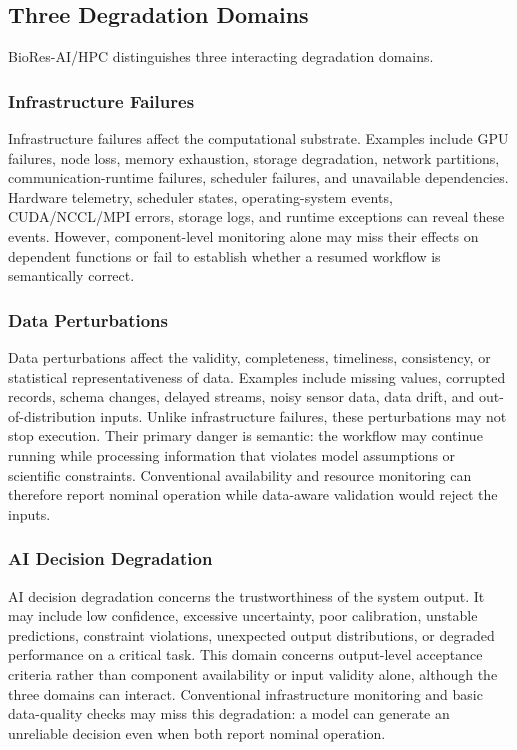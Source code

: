 \documentclass[conference]{IEEEtran}
\begin{document}
\subsection{Three Degradation Domains}

BioRes-AI/HPC distinguishes three interacting degradation domains.

\subsubsection{Infrastructure Failures}
Infrastructure failures affect the computational substrate. Examples include GPU failures, node loss, memory exhaustion, storage degradation, network partitions, communication-runtime failures, scheduler failures, and unavailable dependencies. Hardware telemetry, scheduler states, operating-system events, CUDA/NCCL/MPI errors, storage logs, and runtime exceptions can reveal these events. However, component-level monitoring alone may miss their effects on dependent functions or fail to establish whether a resumed workflow is semantically correct.

\subsubsection{Data Perturbations}
Data perturbations affect the validity, completeness, timeliness, consistency, or statistical representativeness of data. Examples include missing values, corrupted records, schema changes, delayed streams, noisy sensor data, data drift, and out-of-distribution inputs. Unlike infrastructure failures, these perturbations may not stop execution. Their primary danger is semantic: the workflow may continue running while processing information that violates model assumptions or scientific constraints. Conventional availability and resource monitoring can therefore report nominal operation while data-aware validation would reject the inputs.

\subsubsection{AI Decision Degradation}
AI decision degradation concerns the trustworthiness of the system output. It may include low confidence, excessive uncertainty, poor calibration, unstable predictions, constraint violations, unexpected output distributions, or degraded performance on a critical task. This domain concerns output-level acceptance criteria rather than component availability or input validity alone, although the three domains can interact. Conventional infrastructure monitoring and basic data-quality checks may miss this degradation: a model can generate an unreliable decision even when both report nominal operation.
\end{document}
